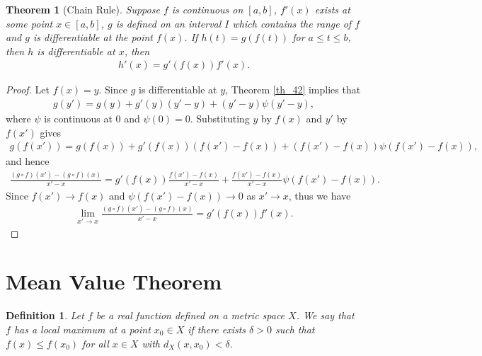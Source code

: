\documentclass[11pt]{book}
\newtheorem{definition}{Definition}[chapter]
\newtheorem{theorem}{Theorem}[chapter]
\theoremstyle{definition}
\numberwithin{equation}{chapter}
\begin{document}
\begin{theorem}[Chain Rule]
Suppose $f$ is continuous on $[a,b]$, $f'(x)$ exists at some point $x \in [a,b]$, $g$ is defined on an interval $I$ which contains the range of $f$ and $g$ is differentiable at the point $f(x)$. If $h(t) = g(f(t))$ for $a \leq t \leq b$, then $h$ is differentiable at $x$, then
\begin{align*}
    h'(x) = g'(f(x)) f'(x).
\end{align*}
\end{theorem}
\begin{proof}
Let $f(x) = y$. Since $g$ is differentiable at $y$, Theorem \ref{th_42} implies that 
\begin{align*}
    g(y') = g(y) + g'(y)(y' - y) + (y' - y) \psi(y' - y),
\end{align*}
where $\psi$ is continuous at $0$ and $\psi(0) = 0$. Substituting $y$ by $f(x)$ and $y'$ by $f(x')$ gives
\begin{align*}
    g(f(x')) = g(f(x)) + g'(f(x))(f(x') - f(x)) + (f(x') - f(x)) \psi(f(x') - f(x)),
\end{align*}
and hence
\begin{align*}
    \frac{(g \circ f)(x') - (g \circ f)(x)}{x' - x} = g'(f(x))\frac{f(x') - f(x)}{x' - x} + \frac{f(x') - f(x)}{x' - x} \psi(f(x') - f(x)).
\end{align*}
Since $f(x') \to f(x)$ and $\psi(f(x') - f(x)) \to 0$ as $x' \to x$, thus we have
\begin{align*}
    \lim_{x' \to x} \frac{(g \circ f)(x') - (g \circ f)(x)}{x' - x}  = g'(f(x)) f'(x).
\end{align*}
\end{proof}

\medskip





\section{Mean Value Theorem}

\begin{definition}
Let $f$ be a real function defined on a metric space $X$. We say that $f$ has a local maximum at a point $x_0 \in X$ if there exists $\delta > 0$ such that $f(x) \leq f(x_0)$ for all $x \in X$ with $d_X(x,x_0) < \delta$.
\end{definition}

\medskip
\end{document}
